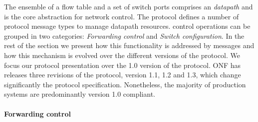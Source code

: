 The ensemble of a flow table and a set of switch ports comprises an \of
\emph{datapath} and is the core abstraction for network control.  The protocol
defines a number of protocol message types to manage datapath resources. \of
control operations can be grouped in two categories: \emph{Forwarding control}
and \emph{Switch configuration}. In the rest of the section we present how this
functionality is addressed by \of messages and how this mechanism is evolved
over the different versions of the protocol. We focus our protocol presentation
over the 1.0 version of the protocol.  ONF has releases three revisions of the
protocol, version 1.1, 1.2 and 1.3, which change significantly the protocol
specification. Nonetheless, the majority of production systems are predominantly
version 1.0 compliant.

\paragraph{Forwarding control}

